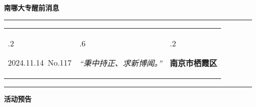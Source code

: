 \documentclass[letterpaper, 12pt]{article}
\begin{document}
\begin{center}
    \Huge\textbf{南哪大专醒前消息}
\end{center}
\vspace{4mm}
\hrule
\renewcommand\tabularxcolumn[1]{m{#1}}
\begin{tabularx}{\textwidth}{>{\hsize.2\hsize}X>{\hsize.6\hsize}X>{\hsize.2\hsize}X}
    \begin{flushleft}
        2024.11.14\, No.117
    \end{flushleft}
    &
    \begin{center}
        \textit{“秉中持正、求新博闻。”}
    \end{center}
    &
    \begin{flushright}
        \textbf{南京市栖霞区}
    \end{flushright}
\end{tabularx}
\vspace{-3.5mm}
\hrule
\vspace{4mm}
\centerline{\huge\textbf{活动预告}}
\end{document}

